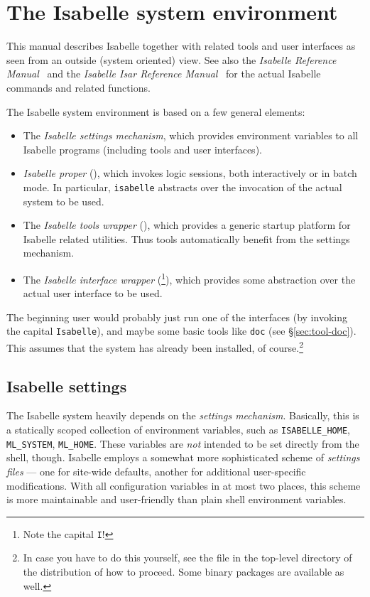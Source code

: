 

\chapter{The Isabelle system environment}

This manual describes Isabelle together with related tools and user interfaces
as seen from an outside (system oriented) view.  See also the \emph{Isabelle
  Reference Manual}~\cite{isabelle-ref} and the \emph{Isabelle Isar Reference
  Manual}~\cite{isabelle-isar-ref} for the actual Isabelle commands and
related functions.

\medskip The Isabelle system environment is based on a few general elements:
\begin{itemize}
\item The \emph{Isabelle settings mechanism}, which provides environment
  variables to all Isabelle programs (including tools and user interfaces).
\item \emph{Isabelle proper} (), which invokes logic
  sessions, both interactively or in batch mode. In particular,
  \texttt{isabelle} abstracts over the invocation of the actual {\ML} system
  to be used.
\item The \emph{Isabelle tools wrapper} (), which provides a
  generic startup platform for Isabelle related utilities.  Thus tools
  automatically benefit from the settings mechanism.
\item The \emph{Isabelle interface wrapper} (\footnote{Note
    the capital \texttt{I}!}), which provides some abstraction over the actual
  user interface to be used.
\end{itemize}

\medskip The beginning user would probably just run one of the interfaces (by
invoking the capital \texttt{Isabelle}), and maybe some basic tools like
\texttt{doc} (see \S\ref{sec:tool-doc}).  This assumes that the system has
already been installed, of course.\footnote{In case you have to do this
  yourself, see the  file in the top-level directory of the
  distribution of how to proceed.  Some binary packages are available as
  well.}


\section{Isabelle settings} \label{sec:settings}

The Isabelle system heavily depends on the \emph{settings
  mechanism}. Basically, this is a statically scoped
collection of environment variables, such as \texttt{ISABELLE_HOME},
\texttt{ML_SYSTEM}, \texttt{ML_HOME}.  These variables are \emph{not} intended
to be set directly from the shell, though.  Isabelle employs a somewhat more
sophisticated scheme of \emph{settings files} --- one for site-wide defaults,
another for additional user-specific modifications.  With all configuration
variables in at most two places, this scheme is more maintainable and
user-friendly than plain shell environment variables.

